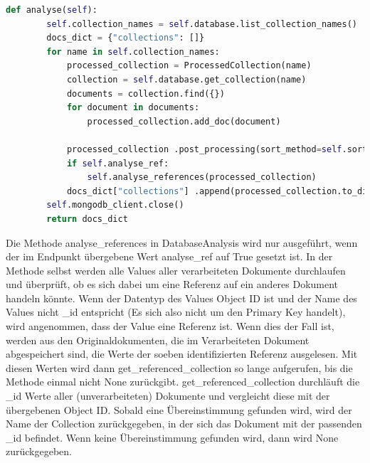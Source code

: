 \begin{lstlisting}[language=python, caption={DatabaseAnalysis.analyse},label={lst:backend_analyse}]
    def analyse(self):
        self.collection_names = self.database.list_collection_names()
        docs_dict = {"collections": []}
        for name in self.collection_names:
            processed_collection = ProcessedCollection(name)
            collection = self.database.get_collection(name)
            documents = collection.find({})
            for document in documents:
                processed_collection.add_doc(document)

            processed_collection .post_processing(sort_method=self.sort_method)
            if self.analyse_ref:
                self.analyse_references(processed_collection)
            docs_dict["collections"] .append(processed_collection.to_dict())
        self.mongodb_client.close()
        return docs_dict
\end{lstlisting}

Die Methode analyse\_references in DatabaseAnalysis wird nur ausgeführt, wenn der im Endpunkt übergebene Wert analyse\_ref auf True gesetzt ist.
In der Methode selbst werden alle Values aller verarbeiteten Dokumente durchlaufen und überprüft, ob es sich dabei um eine Referenz auf ein anderes Dokument handeln könnte.
Wenn der Datentyp des Values Object ID ist und der Name des Values nicht \_id entspricht (Es sich also nicht um den Primary Key handelt), wird angenommen, dass der Value eine Referenz ist.
Wenn dies der Fall ist, werden aus den Originaldokumenten, die im Verarbeiteten Dokument abgespeichert sind, die Werte der soeben identifizierten Referenz ausgelesen.
Mit diesen Werten wird dann get\_referenced\_collection so lange aufgerufen, bis die Methode einmal nicht None zurückgibt.
get\_referenced\_collection durchläuft die \_id Werte aller (unverarbeiteten) Dokumente und vergleicht diese mit der übergebenen Object ID.
Sobald eine Übereinstimmung gefunden wird, wird der Name der Collection zurückgegeben, in der sich das Dokument mit der passenden \_id befindet.
Wenn keine Übereinstimmung gefunden wird, dann wird None zurückgegeben.

